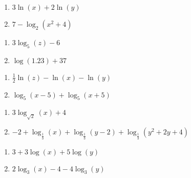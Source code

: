 \documentclass{ximera}
\begin{document}
\begin{multicols}{2}
\begin{enumerate}

\item $3\ln(x) + 2\ln(y)$
\item $7 - \log_{2}(x^{2} + 4)$

\setcounter{HW}{\value{enumi}}
\end{enumerate}
\end{multicols}

\begin{multicols}{2}
\begin{enumerate}
\setcounter{enumi}{\value{HW}}


\item $3\log_{5}(z) - 6$
\item $\log(1.23) + 37$

\setcounter{HW}{\value{enumi}}
\end{enumerate}
\end{multicols}

\begin{multicols}{2}
\begin{enumerate}
\setcounter{enumi}{\value{HW}}

\item $\frac{1}{2}\ln(z) - \ln(x) - \ln(y)$
\item  $\log_{5}(x-5) + \log_{5}(x+5)$

\setcounter{HW}{\value{enumi}}
\end{enumerate}
\end{multicols}

\begin{multicols}{2}
\begin{enumerate}
\setcounter{enumi}{\value{HW}}

\item  $3\log_{\sqrt{2}}(x) + 4$
\item \small$-2 + \log_{\frac{1}{3}}(x) + \log_{\frac{1}{3}}(y - 2) + \log_{\frac{1}{3}}(y^{2} + 2y + 4)$\normalsize

\setcounter{HW}{\value{enumi}}
\end{enumerate}
\end{multicols}

\begin{multicols}{2}
\begin{enumerate}
\setcounter{enumi}{\value{HW}}

\item $3 + 3\log(x) + 5 \log(y)$
\item $2\log_{3}(x) - 4 - 4\log_{3}(y)$

\setcounter{HW}{\value{enumi}}
\end{enumerate}
\end{multicols}
\end{document}
